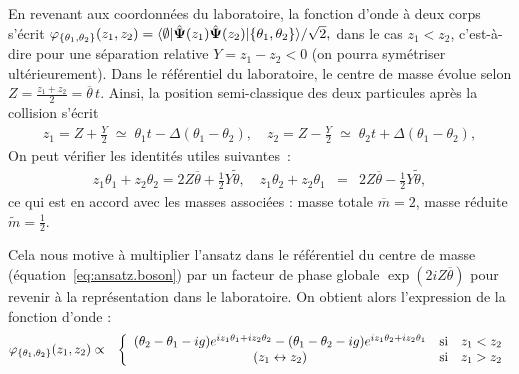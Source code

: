En revenant aux coordonnées du laboratoire, la fonction d’onde à deux corps s’écrit
\(
	\varphi_{\{\theta_1 , \theta_2\}} (z_1, z_2) 
	= \langle \emptyset \vert \hat{\bm{\Psi}} (z_1)\hat{\bm{\Psi}} (z_2) \vert \{\theta_1, \theta_2\} \rangle/\sqrt{2},
\)
dans le cas \(z_1 < z_2\), c’est-à-dire pour une séparation relative \(Y = z_1 - z_2 < 0\) (on pourra symétriser ultérieurement).  
Dans le référentiel du laboratoire, le centre de masse évolue selon
\(
	Z = \frac{z_1 + z_2}{2} = \overline{\theta}\,t.
\)
Ainsi, la position semi-classique des deux particules après la collision s’écrit
\begin{eqnarray}
	z_1 = Z + \frac{Y}{2} \;\simeq\; \theta_1 t - \Delta(\theta_1 - \theta_2),\quad
	z_2 = Z - \frac{Y}{2} \;\simeq\; \theta_2 t + \Delta(\theta_1 - \theta_2),
\end{eqnarray}
On peut vérifier les identités utiles suivantes :
\begin{eqnarray*}
	z_1 \theta_1 + z_2 \theta_2 = 2Z \overline{\theta} + \frac{1}{2} Y \tilde{\theta}, \quad
	z_1 \theta_2 + z_2 \theta_1 &=& 2Z \overline{\theta} - \frac{1}{2} Y \tilde{\theta},
\end{eqnarray*}
ce qui est en accord avec les masses associées : masse totale \(\overline{m} = 2\), masse réduite \(\tilde{m} = \frac{1}{2}\).

Cela nous motive à multiplier l’ansatz dans le référentiel du centre de masse (équation~\eqref{eq:ansatz.boson}) par un facteur de phase globale \(\exp(2iZ\overline{\theta})\) pour revenir à la représentation dans le laboratoire. On obtient alors l’expression de la fonction d’onde :
\begin{eqnarray}\label{eq:I-1-10}
	\varphi_{\{\theta_1 , \theta_2\}}(z_1 , z_2) & \propto &  \left \{ \begin{array} { c cl} ( \theta_2 - \theta_1 - ig) e^{ i z_1 \theta_1 + iz_2 \theta_2 } - ( \theta_1 - \theta_2 - ig) e^{ i z_1 \theta_2 + iz_2 \theta_1} & \mbox{si} & z_1 < z_2 \\ (z_1 \leftrightarrow z_2) & \mbox{si} & z_1 > z_2 \end{array} \right.
\end{eqnarray}

